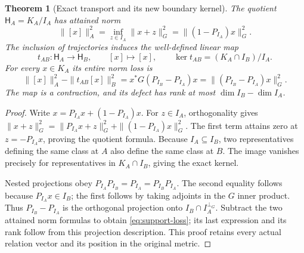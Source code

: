 \documentclass[11pt,a4paper]{article}
\newtheorem{theorem}{Theorem}[section]
\theoremstyle{definition}\newtheorem{definition}[theorem]{Definition}
\begin{document}
\begin{theorem}[Exact transport and its new boundary kernel]\label{thm:support-metric-transport}
The quotient $\mathsf H_A=K_A/I_A$ has attained norm
\[
 \|[x]\|_A^2=\inf_{z\in I_A}\|x+z\|_G^2
 =\|(1-P_{I_A})x\|_G^2.
\]
The inclusion of trajectories induces the well-defined linear map
\[
 t_{AB}:\mathsf H_A\to\mathsf H_B,\qquad[x]\mapsto[x],
 \qquad\ker t_{AB}=(K_A\cap I_B)/I_A.
\]
For every $x\in K_A$ its entire norm loss is
\begin{equation}\label{eq:support-loss}
 \|[x]\|_A^2-\|t_{AB}[x]\|_B^2
 =x^*G(P_{I_B}-P_{I_A})x
 =\|(P_{I_B}-P_{I_A})x\|_G^2.
\end{equation}
The map is a contraction, and its defect has rank at most $\dim I_B-\dim I_A$.
\end{theorem}
\begin{proof}
Write $x=P_{I_A}x+(1-P_{I_A})x$. For $z\in I_A$, orthogonality gives
$\|x+z\|_G^2=\|P_{I_A}x+z\|_G^2+\|(1-P_{I_A})x\|_G^2$.
The first term attains zero at $z=-P_{I_A}x$, proving the quotient formula. Because $I_A\subseteq I_B$, two representatives defining the same class at $A$ also define the same class at $B$. The image vanishes precisely for representatives in $K_A\cap I_B$, giving the exact kernel.

Nested projections obey $P_{I_A}P_{I_B}=P_{I_A}=P_{I_B}P_{I_A}$. The second equality follows because $P_{I_A}x\in I_B$; the first follows by taking adjoints in the $G$ inner product. Thus $P_{I_B}-P_{I_A}$ is the orthogonal projection onto $I_B\cap I_A^{\perp_G}$. Subtract the two attained norm formulas to obtain \eqref{eq:support-loss}; its last expression and its rank follow from this projection description. This proof retains every actual relation vector and its position in the original metric.
\end{proof}
\end{document}
